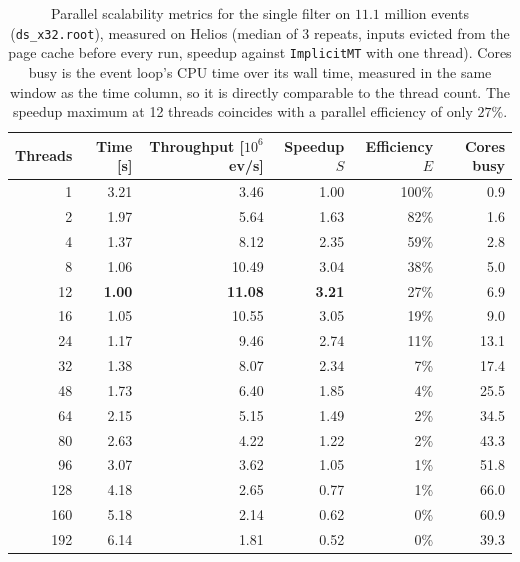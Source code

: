 \begin{table}[htbp]
\centering
\caption{Parallel scalability metrics for the single filter on $11.1$ million events (\texttt{ds\_x32.root}), measured on Helios (median of 3 repeats, inputs evicted from the page cache before every run, speedup against \texttt{ImplicitMT} with one thread). Cores busy is the event loop's CPU time over its wall time, measured in the same window as the time column, so it is directly comparable to the thread count. The speedup maximum at 12 threads coincides with a parallel efficiency of only $27\%$.}
\label{tab:scalability-filter}
\begin{tabular}{rrrrrr}
\toprule
Threads & Time [s] & Throughput [$10^6$ ev/s] & Speedup $S$ & Efficiency $E$ & Cores busy \\
\midrule
 1 & 3.21 & 3.46 & 1.00 & 100\% & 0.9 \\
 2 & 1.97 & 5.64 & 1.63 & 82\% & 1.6 \\
 4 & 1.37 & 8.12 & 2.35 & 59\% & 2.8 \\
 8 & 1.06 & 10.49 & 3.04 & 38\% & 5.0 \\
12 & \textbf{1.00} & \textbf{11.08} & \textbf{3.21} & 27\% & 6.9 \\
16 & 1.05 & 10.55 & 3.05 & 19\% & 9.0 \\
24 & 1.17 & 9.46 & 2.74 & 11\% & 13.1 \\
32 & 1.38 & 8.07 & 2.34 & 7\% & 17.4 \\
48 & 1.73 & 6.40 & 1.85 & 4\% & 25.5 \\
64 & 2.15 & 5.15 & 1.49 & 2\% & 34.5 \\
80 & 2.63 & 4.22 & 1.22 & 2\% & 43.3 \\
96 & 3.07 & 3.62 & 1.05 & 1\% & 51.8 \\
128 & 4.18 & 2.65 & 0.77 & 1\% & 66.0 \\
160 & 5.18 & 2.14 & 0.62 & 0\% & 60.9 \\
192 & 6.14 & 1.81 & 0.52 & 0\% & 39.3 \\
\bottomrule
\end{tabular}
\end{table}
